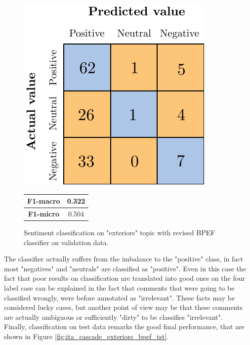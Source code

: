 \begin{figure}[H]
	\begin{minipage}[b]{0.6\linewidth}
		\centering
		\includegraphics[scale=1]{figures/conf_matrices/ita_exteriors/ita_snt_exteriors_bpef_afs.pdf}
	\end{minipage}
	\begin{minipage}[b]{0.3\linewidth}
		\begin{tabular}[b]{ | c | c | } 
			\hline
			\textbf{F1-macro} & 0.322 \\
			\hline
			\textbf{F1-micro} & 0.504 \\ 
			\hline
		\end{tabular}
	\end{minipage}
	\caption{Sentiment classification on "exteriors" topic with revised BPEF classifier on validation data.}
	\label{fig:ita_snt_exteriors_bpef_afs}
\end{figure}


The classifier actually suffers from the imbalance to the "positive" class, in fact most "negatives" and "neutrals" are classified as "positive". Even in this case the fact that poor results on classification are translated into good ones on the four label case can be explained in the fact that comments that were going to be classified wrongly, were before annotated as "irrelevant". These facts may be considered lucky cases, but another point of view may be that these comments are actually ambiguous or sufficiently "dirty" to be classifies "irrelevant".\\
Finally, classification on test data remarks the good final performance, that are shown in Figure \ref{fig:ita_cascade_exteriors_bpef_tst}.

